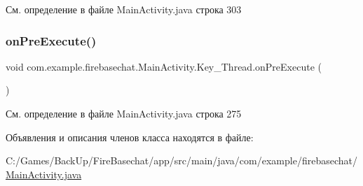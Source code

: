См. определение в файле Main\+Activity.\+java строка 303

\mbox{\label{classcom_1_1example_1_1firebasechat_1_1_main_activity_1_1_key___thread_ab4f5d0fba51cf4688bbb5bcdec87fe57}} 
\subsubsection{\texorpdfstring{on\+Pre\+Execute()}{onPreExecute()}}
{\footnotesize\ttfamily void com.\+example.\+firebasechat.\+Main\+Activity.\+Key\+\_\+\+Thread.\+on\+Pre\+Execute (\begin{DoxyParamCaption}{ }\end{DoxyParamCaption})\hspace{0.3cm}{\ttfamily [protected]}}



См. определение в файле Main\+Activity.\+java строка 275



Объявления и описания членов класса находятся в файле\+:\begin{DoxyCompactItemize}
\item 
C\+:/\+Games/\+Back\+Up/\+Fire\+Basechat/app/src/main/java/com/example/firebasechat/\mbox{\hyperlink{_main_activity_8java}{Main\+Activity.\+java}}\end{DoxyCompactItemize}
